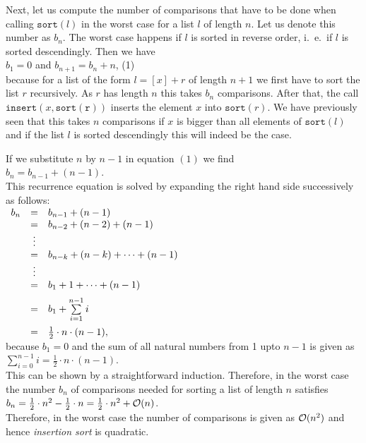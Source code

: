 Next, let us compute the number of comparisons that have to be done when calling
$\texttt{sort}(l)$ in the worst case for a list  $l$ of length $n$.  Let us denote this number as
$b_n$. The worst case happens if $l$ is sorted in reverse order, i.~e.~if $l$ is sorted
descendingly.   
Then we have \\[0.2cm]
\hspace*{1.3cm}
 $b_1 = 0$ \quad and \quad $b_{n+1} = b_n + n$, \hspace*{\fill} (1)
\\[0.2cm]
because for a list of the form $l = [x] + r$ of length $n+1$ we first have to sort the list $r$
recursively.  As $r$ has length $n$ this takes $b_n$ comparisons.  After that, the call
$\mathtt{insert}(x, \mathtt{sort(r)})$ 
inserts the element $x$ into $\mathtt{sort}(r)$.  We have previously seen that this takes $n$
comparisons if $x$ is bigger than all elements of $\mathtt{sort}(l)$ and if the list $l$ is sorted
descendingly this will indeed be the case.

If we substitute $n$ by $n-1$ in equation $(1)$ we find
\\[0.2cm]
\hspace*{1.3cm}
$b_n = b_{n-1} + (n - 1)$.
\\[0.2cm]
This recurrence equation is solved by expanding the right hand side successively as follows:
\\[0.2cm]
\hspace*{1.3cm}
$
\begin{array}[t]{lcl}
  b_{n} & = & b_{n-1} + (n - 1)                     \\ 
        & = & b_{n-2} + (n - 2) + (n - 1)           \\ 
        & \vdots &                                  \\
        & = & b_{n-k} + (n - k) + \cdots + (n - 1)  \\ 
        & \vdots &                                  \\
        & = & b_{1} + 1 + \cdots + (n - 1)      \\[0.2cm] 
        & = & b_{1} + \sum\limits_{i = 1}^{n - 1} i \\[0.4cm]
        & = & \frac{1}{2} \cdot n \cdot (n - 1),
\end{array}
$
\\[0.2cm]
because $b_1 = 0$ and the sum of all natural numbers from 1 upto  $n - 1$ is given as
\\[0.2cm]
\hspace*{1.3cm}
$\sum\limits_{i = 0}^{n - 1} i  = \frac{1}{2} \cdot n \cdot (n - 1)$.
\\[0.2cm]
This can be shown by a straightforward induction.  Therefore, in the worst case the number $b_n$ of
comparisons needed for sorting a list of length $n$  satisfies 
\\[0.2cm]
\hspace*{1.3cm}
$b_n = \frac{1}{2} \cdot n^2 - \frac{1}{2} \cdot n = \frac{1}{2} \cdot n^2 + \mathcal{O}(n)$.
\\[0.2cm]
Therefore, in the worst case the number of comparisons is given as $\mathcal{O}(n^2)$ and hence
\emph{insertion sort} is quadratic.


